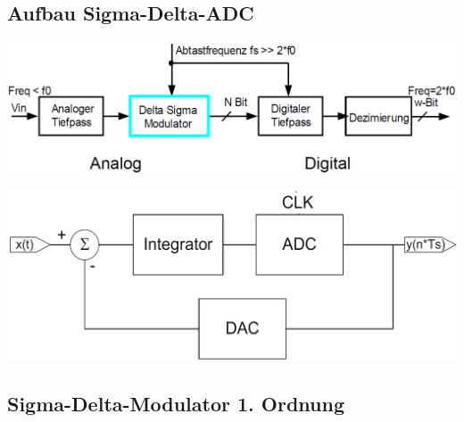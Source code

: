 \subsection{Aufbau Sigma-Delta-ADC}
\label{Aufbau Sigma-Delta-ADC}

\begin{minipage}[t]{0.6\columnwidth}
    \begin{center}
    \end{center}
    \includegraphics[width=\columnwidth]{images/aufbau_sigma_delta_ADC.png}
\end{minipage}
\hfill
\begin{minipage}[t]{0.38\columnwidth}
    \begin{center}
    \end{center}
    \includegraphics[width=\columnwidth]{images/aufbau_sigma_delta_modulator.png}
\end{minipage}


\subsection{Sigma-Delta-Modulator 1. Ordnung}
\label{Sigma-Delta-modulator Ordnung 1}

